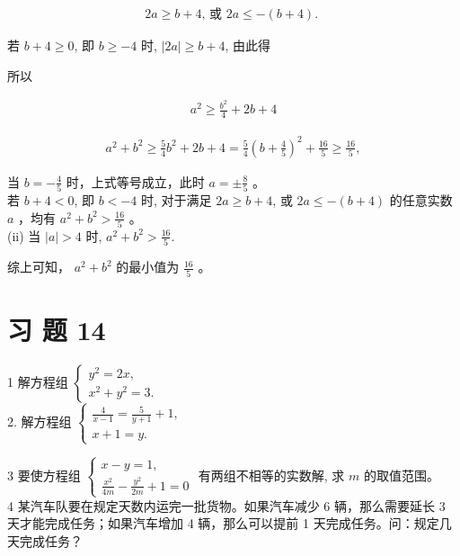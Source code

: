 \documentclass[10pt]{article}
\begin{document}
\begin{align*}
2 a \geqslant b+4 \text {, 或 } 2 a \leqslant-(b+4) \text {. }
\end{align*}

若 $b+4 \geqslant 0$, 即 $b \geqslant-4$ 时, $|2 a| \geqslant b+4$, 由此得

所以

\begin{align*}
a^{2} \geqslant \frac{b^{2}}{4}+2 b+4
\end{align*}

\begin{align*}
a^{2}+b^{2} \geqslant \frac{5}{4} b^{2}+2 b+4=\frac{5}{4}\left(b+\frac{4}{5}\right)^{2}+\frac{16}{5} \geqslant \frac{16}{5},
\end{align*}

当 $b=-\frac{4}{5}$ 时，上式等号成立，此时 $a= \pm \frac{8}{5}$ 。\\
若 $b+4<0$, 即 $b<-4$ 时, 对于满足 $2 a \geqslant b+4$, 或 $2 a \leqslant-(b+4)$ 的任意实数 $a$ ，均有 $a^{2}+b^{2}>\frac{16}{5}$ 。\\
(ii) 当 $|a|>4$ 时, $a^{2}+b^{2}>\frac{16}{5}$.

综上可知， $a^{2}+b^{2}$ 的最小值为 $\frac{16}{5}$ 。

\section*{习 题 14}
1 解方程组 $\left\{\begin{array}{l}y^{2}=2 x, \\ x^{2}+y^{2}=3 .\end{array}\right.$\\
2. 解方程组 $\left\{\begin{array}{l}\frac{4}{x-1}=\frac{5}{y+1}+1, \\ x+1=y .\end{array}\right.$

3 要使方程组 $\left\{\begin{array}{l}x-y=1, \\ \frac{x^{2}}{4 m}-\frac{y^{2}}{2 m}+1=0\end{array}\right.$ 有两组不相等的实数解, 求 $m$ 的取值范围。\\
4 某汽车队要在规定天数内运完一批货物。如果汽车减少 6 辆，那么需要延长 3 天才能完成任务；如果汽车增加 4 辆，那么可以提前 1 天完成任务。问：规定几天完成任务？
\end{document}

